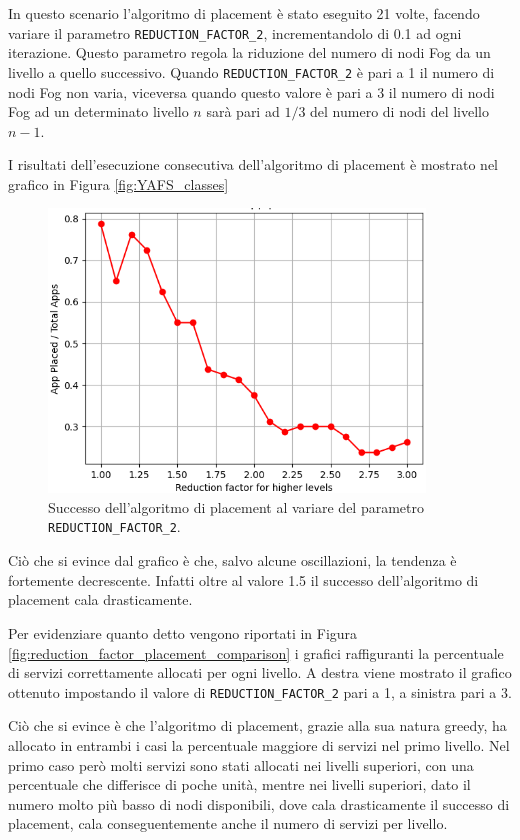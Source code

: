 In questo scenario l'algoritmo di placement è stato eseguito 21 volte, facendo variare il parametro \texttt{REDUCTION\_FACTOR\_2}, incrementandolo di 0.1 ad ogni iterazione. Questo parametro regola la riduzione del numero di nodi Fog da un livello a quello successivo. Quando \texttt{REDUCTION\_FACTOR\_2} è pari a 1 il numero di nodi Fog non varia, viceversa quando questo valore è pari a 3 il numero di nodi Fog ad un determinato livello $n$ sarà pari ad $1/3$ del numero di nodi del livello $n-1$.

I risultati dell'esecuzione consecutiva dell'algoritmo di placement è mostrato nel grafico in Figura \ref{fig:YAFS_classes}

\begin{figure}[!ht]
  \includegraphics[width=10cm]{images/nodes_number_placement_success}
  \centering
  \caption{Successo dell'algoritmo di placement al variare del parametro \texttt{REDUCTION\_FACTOR\_2}.}
  \label{fig:nodes_number_placement_success}
\end{figure}

Ciò che si evince dal grafico è che, salvo alcune oscillazioni, la tendenza è fortemente decrescente. Infatti oltre al valore 1.5 il successo dell'algoritmo di placement cala drasticamente. 

Per evidenziare quanto detto vengono riportati in Figura \ref{fig:reduction_factor_placement_comparison} i grafici raffiguranti la percentuale di servizi correttamente allocati per ogni livello. A destra viene mostrato il grafico ottenuto impostando il valore di \texttt{REDUCTION\_FACTOR\_2} pari a 1, a sinistra pari a 3. 

Ciò che si evince è che l'algoritmo di placement, grazie alla sua natura greedy, ha allocato in entrambi i casi la percentuale maggiore di servizi nel primo livello. Nel primo caso però molti servizi sono stati allocati nei livelli superiori, con una percentuale che differisce di poche unità, mentre nei livelli superiori, dato il numero molto più basso di nodi disponibili, dove cala drasticamente il successo di placement, cala conseguentemente anche il numero di servizi per livello.

